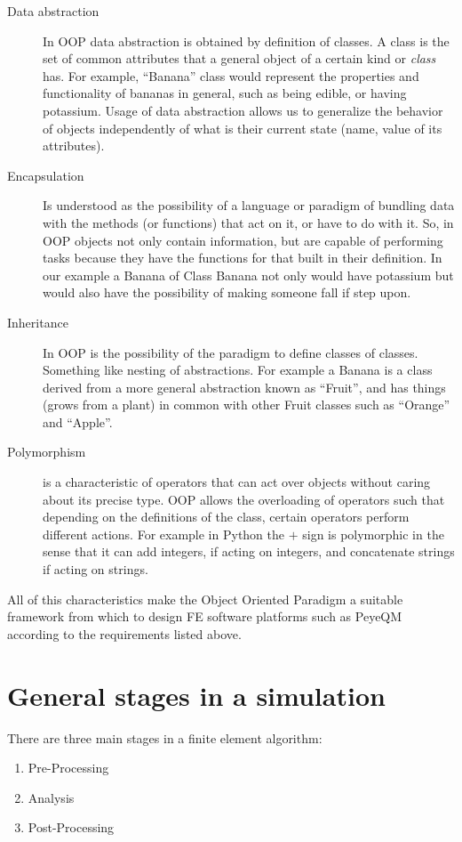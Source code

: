 \begin{description}
\item[Data abstraction] In OOP data abstraction is obtained by definition of classes. A class is the set of common attributes that a general object of a certain kind or \textit{class} has. For example, ``Banana'' class would represent the properties and functionality of bananas in general, such as being edible, or having potassium. Usage of data abstraction allows us to generalize the behavior of objects independently of what is their current state (name, value of its attributes).  
\item[Encapsulation] Is understood as the possibility of a language or paradigm of bundling data with the methods (or functions) that act on it, or have to do with it. So, in OOP objects not only contain information, but are capable of performing tasks because they have the functions for that built in their definition. In our example a Banana of Class Banana not only would have potassium but would also have the possibility of making someone fall if step upon.
\item[Inheritance] In OOP is the possibility of the paradigm to define classes of classes. Something like nesting of abstractions. For example a Banana is a class derived from a more general abstraction known as ``Fruit'', and has things (grows from a plant) in common with other Fruit classes such as ``Orange'' and ``Apple''.
\item[Polymorphism] is a characteristic of operators that can act over objects without caring about its precise type. OOP allows the overloading of operators such that depending on the definitions of the class, certain operators perform different actions. For example in Python the $+$ sign is polymorphic in the sense that it can add integers, if acting on integers, and concatenate strings if acting on strings.
\end{description}

All of this characteristics make the Object Oriented Paradigm a suitable framework from which to design FE software platforms such as PeyeQM according to the requirements listed above.

\section{General stages in a simulation}

There are three main stages in a finite element algorithm:

\begin{enumerate}
\item Pre-Processing
\item Analysis
\item Post-Processing
\end{enumerate}

